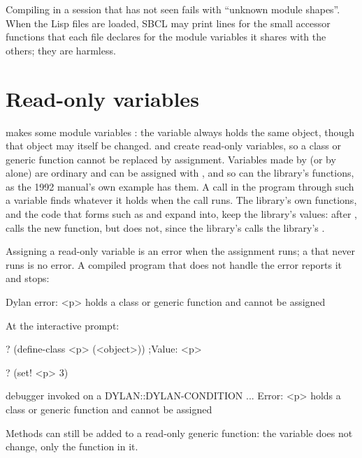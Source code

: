 \noindent
Compiling  in a session that has not seen
 fails with ``unknown module shapes''. When the Lisp
files are loaded, SBCL may print  lines for
the small accessor functions that each file declares for the module
variables it shares with the others; they are harmless.

\section{Read-only variables}\label{sec:modules-readonly}

 makes some module variables : the
variable always holds the same object, though that object may itself be
changed.  and  create
read-only variables, so a class or generic function cannot be replaced by
assignment. Variables made by  (or by 
alone) are ordinary and can be assigned with , and so can the
library's functions, as the 1992 manual's own example  has them. A call in the program through such a variable
finds whatever it holds when the call runs. The library's own functions,
and the code that forms such as  and  expand
into, keep the library's values: after ,
 calls the new function, but  does not,
since the library's \code{+} calls the library's .

Assigning a read-only variable is an error when the assignment runs; a
 that never runs is no error. A compiled program that does not
handle the error reports it and stops:

\begin{shell}
Dylan error: <p> holds a class or generic function and cannot be assigned
\end{shell}

\noindent
At the interactive prompt:

\begin{repl}
? (define-class <p> (<object>))
;Value: <p>

? (set! <p> 3)

debugger invoked on a DYLAN::DYLAN-CONDITION ...
  Error: <p> holds a class or generic function and cannot be assigned
\end{repl}

\noindent
Methods can still be added to a read-only generic function: the variable
does not change, only the function in it.

